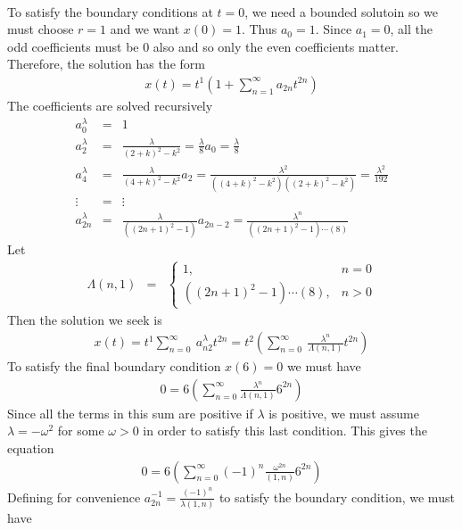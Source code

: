\documentclass[11pt]{SelfArxOneColBMN}
\begin{document}
\begin{exercise}
\begin{solution}
\begin{eqnarray*}
    \end{eqnarray*}
    To satisfy the boundary conditions at $t = 0$, we need a bounded solutoin so we must choose $r = 1$ and we want $x(0) = 1$. Thus $a_0  = 1$. Since $a_1 = 0$, all the odd coefficients must be 0 also and so only the even coefficients matter. Therefore, the solution has the form
    \begin{eqnarray*}
      x(t) = t^1(1 + \sum_{n=1}^\infty a_{2n}t^{2n})
    \end{eqnarray*}
    The coefficients are solved recursively
    \begin{eqnarray*}
      a_0^\lambda &=& 1\\
      a_2^\lambda &=& \frac{\lambda}{(2 + k)^2 - k^2} = \frac{\lambda}{8}a_0 = \frac{\lambda}{8}\\
      a_4^\lambda &=& \frac{\lambda}{(4 + k)^2 - k^2}a_2 = \frac{\lambda^2}{((4 + k)^2 - k^2)((2 + k)^2 - k^2)} = \frac{\lambda^2}{192}\\
      \vdots &=& \vdots\\
      a_{2n}^\lambda &=& \frac{\lambda}{((2n + 1)^2 - 1)}a_{2n - 2} = \frac{\lambda^n}{((2n + 1)^2 - 1)\cdots(8)}
    \end{eqnarray*}
    Let
    \begin{eqnarray*}
      \Lambda(n,1) &=&
      \left \{
      \begin{array}{ll}
        1, & n = 0\\
        ((2n + 1)^2 - 1)\cdots(8), & n > 0 
      \end{array}
      \right .
    \end{eqnarray*}
    Then the solution we seek is
    \begin{eqnarray*}
      x(t) = t^1\sum_{n = 0}^\infty\:a_{n2}^\lambda t^{2n} = t^2(\sum_{n=0}^\infty\:\frac{\lambda^n}{\Lambda(n,1)}t^{2n})
    \end{eqnarray*}
    To satisfy the final boundary condition $x(6) = 0$ we must have
    \begin{eqnarray*}
      0 = 6(\sum_{n = 0}^\infty\frac{\lambda^n}{\Lambda(n,1)}6^{2n})
    \end{eqnarray*}
    Since all the terms in this sum are positive if $\lambda$ is positive, we must assume $\lambda = -\omega^2$ for some $\omega > 0$ in order to satisfy this last condition. This gives the equation
    \begin{eqnarray*}
      0 = 6(\sum_{n = 0}^\infty(-1)^n\frac{\omega^{2n}}{(1,n)}6^{2n})
    \end{eqnarray*}
    Defining for convenience $a_{2n}^{-1} = \frac{(-1)^n}{\lambda(1,n)}$ to satisfy the boundary condition, we must have

\end{solution}
\end{exercise}
\end{document}

